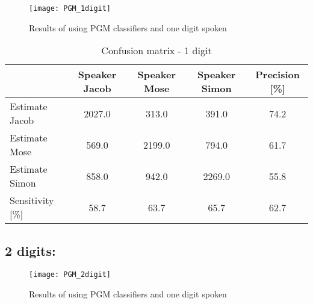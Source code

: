 \begin{figure}[H]
\centering
\texttt{[image: PGM\_1digit]}
\caption{Results of using PGM classifiers and one digit spoken}
\label{fig:PGM_1dig}
\end{figure}

\begin{table}[H]                                                    
\centering                                                          
\begin{tabular}{|l|c|c|c|c|}                                        
\hline                                                              
  & Speaker Jacob & Speaker Mose & Speaker Simon & Precision [\%] \\
\hline                                                              
Estimate Jacob & 2027.0 & 313.0 & 391.0 & 74.2 \\                   
\hline                                                              
Estimate Mose & 569.0 & 2199.0 & 794.0 & 61.7 \\                    
\hline                                                              
Estimate Simon & 858.0 & 942.0 & 2269.0 & 55.8 \\                   
\hline                                                              
Sensitivity [\%] & 58.7 & 63.7 & 65.7 & 62.7 \\                     
\hline                                                              
\end{tabular}                                                       
\caption{Confusion matrix - 1 digit}                                
\label{table:PGM_conf_1}                                            
\end{table}       


\subsection{2 digits:}

\begin{figure}[H]
\centering
\texttt{[image: PGM\_2digit]}
\caption{Results of using PGM classifiers and one digit spoken}
\label{fig:PGM_1dig}
\end{figure}

